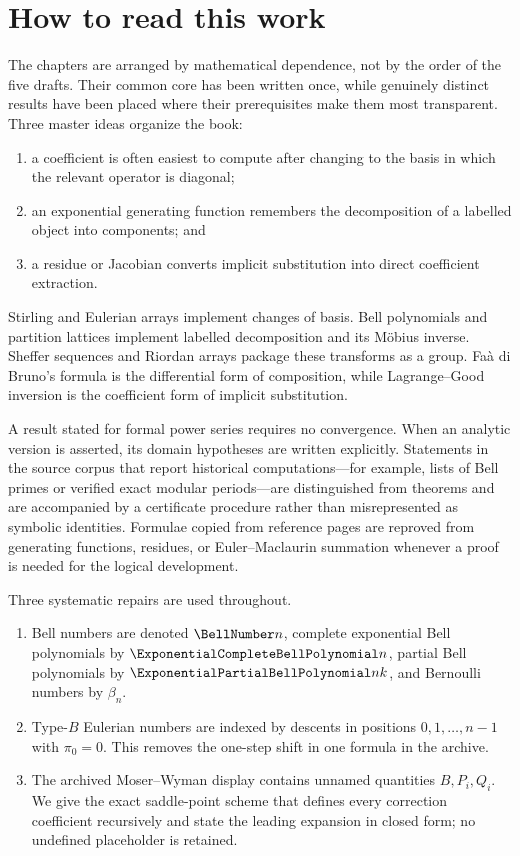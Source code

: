\documentclass[11pt,a4paper,oneside,openany]{book}
\theoremstyle{definition}
\theoremstyle{remark}
\begin{document}
\chapter*{How to read this work}
The chapters are arranged by mathematical dependence, not by the order of the five
drafts.  Their common core has been written once, while genuinely distinct results
have been placed where their prerequisites make them most transparent.  Three
master ideas organize the book:
\begin{enumerate}
  \item a coefficient is often easiest to compute after changing to the basis in
        which the relevant operator is diagonal;
  \item an exponential generating function remembers the decomposition of a
        labelled object into components; and
  \item a residue or Jacobian converts implicit substitution into direct
        coefficient extraction.
\end{enumerate}
Stirling and Eulerian arrays implement changes of basis.  Bell polynomials and
partition lattices implement labelled decomposition and its M\"obius inverse.
Sheffer sequences and Riordan arrays package these transforms as a group.  Fa\`a di
Bruno's formula is the differential form of composition, while Lagrange--Good
inversion is the coefficient form of implicit substitution.

A result stated for formal power series requires no convergence.  When an analytic
version is asserted, its domain hypotheses are written explicitly.  Statements in the source corpus that report historical computations---for example,
lists of Bell primes or verified exact modular periods---are distinguished from
theorems and are accompanied by a certificate procedure rather than misrepresented
as symbolic identities.  Formulae copied from reference pages are reproved from
generating functions, residues, or Euler--Maclaurin summation whenever a proof is
needed for the logical development.

\begin{auditbox}
Three systematic repairs are used throughout.
\begin{enumerate}
\item Bell numbers are denoted $\BellNumber n$, complete exponential Bell polynomials by
      $\ExponentialCompleteBellPolynomial n$, partial Bell polynomials by $\ExponentialPartialBellPolynomial nk$, and Bernoulli numbers by
      $\beta_n$.
\item Type-$B$ Eulerian numbers are indexed by descents in positions
      $0,1,\ldots,n-1$ with $\pi_0=0$.  This removes the one-step shift in one formula
      in the archive.
\item The archived Moser--Wyman display contains unnamed quantities
      $B,P_i,Q_i$.  We give the exact saddle-point scheme that defines every
      correction coefficient recursively and state the leading expansion in closed
      form; no undefined placeholder is retained.
\end{enumerate}
\end{auditbox}
\end{document}
